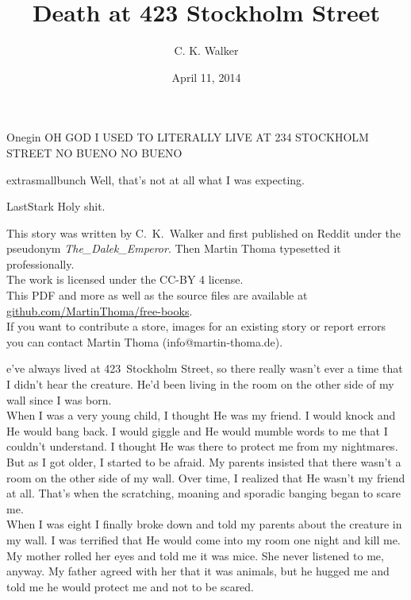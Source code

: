 \documentclass[a5paper]{scrartcl}
\title{Death at 423 Stockholm Street}
\author{C. K. Walker}
\date{April 11, 2014}
\begin{document}
\maketitle

\begin{shadequote}[l]{Onegin}
OH GOD I USED TO LITERALLY LIVE AT 234 STOCKHOLM STREET NO BUENO NO BUENO
\end{shadequote}

\begin{shadequote}[l]{extrasmallbunch}
Well, that's not at all what I was expecting.
\end{shadequote}

\begin{shadequote}[l]{LastStark}
Holy shit.
\end{shadequote}
\clearpage

\clearpage

This story was written by C.~K.~Walker and first published on Reddit under the
pseudonym \textit{The\_Dalek\_Emperor}. Then
Martin Thoma typesetted it professionally.\\

The work is licensed under the CC-BY 4 license.\\

This PDF and more as well as the source files are available at
\url{github.com/MartinThoma/free-books}.\\

If you want to contribute a store, images for an existing story or report
errors you can contact Martin Thoma (info@martin-thoma.de).

\clearpage

e've always lived at 423~Stockholm Street, so there really wasn't ever a time that I didn't hear the creature. He'd been living in the room on the other side of my wall since I was born.\\


When I was a very young child, I thought He was my friend. I would knock and He would bang back. I would giggle and He would mumble words to me that I couldn't understand. I thought He was there to protect me from my nightmares. But as I got older, I started to be afraid. My parents insisted that there wasn't a room on the other side of my wall. Over time, I realized that He wasn't my friend at all. That's when the scratching, moaning and sporadic banging began to scare me.\\


When I was eight I finally broke down and told my parents about the creature in my wall. I was terrified that He would come into my room one night and kill me. My mother rolled her eyes and told me it was mice. She never listened to me, anyway. My father agreed with her that it was animals, but he hugged me and told me he would protect me and not to be scared.\\
\end{document}
